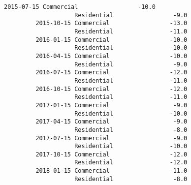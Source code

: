\documentclass[11pt]{article}
\begin{document}
\begin{Verbatim}[commandchars=\\\{\}]
         2015-07-15 Commercial                 -10.0   
                    Residential                 -9.0   
         2015-10-15 Commercial                 -13.0   
                    Residential                -11.0   
         2016-01-15 Commercial                 -10.0   
                    Residential                -10.0   
         2016-04-15 Commercial                 -10.0   
                    Residential                 -9.0   
         2016-07-15 Commercial                 -12.0   
                    Residential                -11.0   
         2016-10-15 Commercial                 -12.0   
                    Residential                -11.0   
         2017-01-15 Commercial                  -9.0   
                    Residential                -10.0   
         2017-04-15 Commercial                  -9.0   
                    Residential                 -8.0   
         2017-07-15 Commercial                  -9.0   
                    Residential                -10.0   
         2017-10-15 Commercial                 -12.0   
                    Residential                -12.0   
         2018-01-15 Commercial                 -11.0   
                    Residential                 -8.0   
         

\end{Verbatim}
\end{document}
